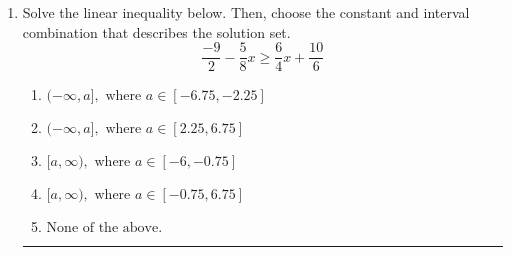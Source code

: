 \documentclass[14pt]{extbook}
\newcommand{\litem}[1]{\item#1\hspace*{-1cm}\rule{\textwidth}{0.4pt}}
\begin{document}
\begin{enumerate}
{\begin{enumerate}[label=\Alph*.]
\end{enumerate} }
\litem{
Solve the linear inequality below. Then, choose the constant and interval combination that describes the solution set.\[ \frac{-9}{2} - \frac{5}{8} x \geq \frac{6}{4} x + \frac{10}{6} \]\begin{enumerate}[label=\Alph*.]
\item \( (-\infty, a], \text{ where } a \in [-6.75, -2.25] \)
\item \( (-\infty, a], \text{ where } a \in [2.25, 6.75] \)
\item \( [a, \infty), \text{ where } a \in [-6, -0.75] \)
\item \( [a, \infty), \text{ where } a \in [-0.75, 6.75] \)
\item \( \text{None of the above}. \)

\end{enumerate} }
\end{enumerate}
\end{document}
